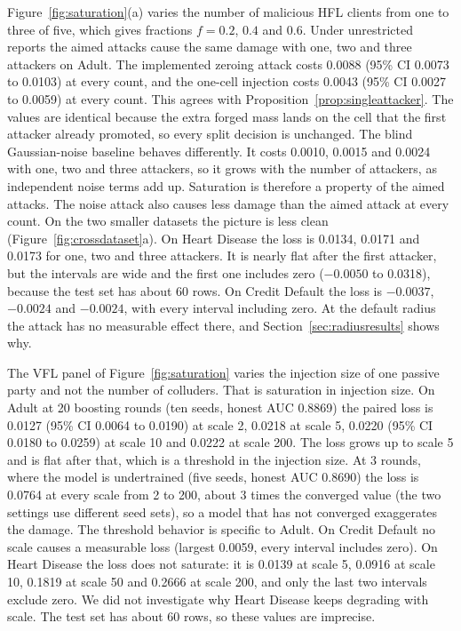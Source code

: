 \documentclass[11pt]{article}
\newcommand{\rev}[1]{{\color{blue}#1}}
\begin{document}
\rev{Figure~\ref{fig:saturation}(a) varies the number of malicious HFL clients from one to three of five, which gives fractions $f=0.2$, $0.4$ and $0.6$. Under unrestricted reports the aimed attacks cause the same damage with one, two and three attackers on Adult. The implemented zeroing attack costs 0.0088 (95\% CI 0.0073 to 0.0103) at every count, and the one-cell injection costs 0.0043 (95\% CI 0.0027 to 0.0059) at every count. This agrees with Proposition~\ref{prop:singleattacker}. The values are identical because the extra forged mass lands on the cell that the first attacker already promoted, so every split decision is unchanged. The blind Gaussian-noise baseline behaves differently. It costs 0.0010, 0.0015 and 0.0024 with one, two and three attackers, so it grows with the number of attackers, as independent noise terms add up. Saturation is therefore a property of the aimed attacks. The noise attack also causes less damage than the aimed attack at every count. On the two smaller datasets the picture is less clean (Figure~\ref{fig:crossdataset}a). On Heart Disease the loss is 0.0134, 0.0171 and 0.0173 for one, two and three attackers. It is nearly flat after the first attacker, but the intervals are wide and the first one includes zero ($-0.0050$ to 0.0318), because the test set has about 60 rows. On Credit Default the loss is $-0.0037$, $-0.0024$ and $-0.0024$, with every interval including zero. At the default radius the attack has no measurable effect there, and Section~\ref{sec:radiusresults} shows why.}

\rev{The VFL panel of Figure~\ref{fig:saturation} varies the injection size of one passive party and not the number of colluders. That is saturation in injection size.} \rev{On Adult at 20 boosting rounds (ten seeds, honest AUC 0.8869) the paired loss is 0.0127 (95\% CI 0.0064 to 0.0190) at scale 2, 0.0218 at scale 5, 0.0220 (95\% CI 0.0180 to 0.0259) at scale 10 and 0.0222 at scale 200. The loss grows up to scale 5 and is flat after that, which is a threshold in the injection size. At 3 rounds, where the model is undertrained (five seeds, honest AUC 0.8690) the loss is 0.0764 at every scale from 2 to 200, about 3 times the converged value (the two settings use different seed sets), so a model that has not converged exaggerates the damage. The threshold behavior is specific to Adult. On Credit Default no scale causes a measurable loss (largest 0.0059, every interval includes zero). On Heart Disease the loss does not saturate: it is 0.0139 at scale 5, 0.0916 at scale 10, 0.1819 at scale 50 and 0.2666 at scale 200, and only the last two intervals exclude zero. We did not investigate why Heart Disease keeps degrading with scale. The test set has about 60 rows, so these values are imprecise.}
\end{document}
